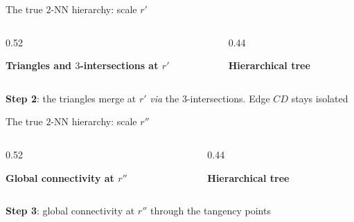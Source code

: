 \documentclass[A4,svgnames,9pt,aspectratio=169]{beamer}
\begin{document}
\begin{frame}{The true $2$-NN hierarchy: scale $r'$}
    \begin{columns}[c, onlytextwidth]
        \begin{column}{0.52\textwidth}
            \begin{center}
                \textbf{Triangles and $3$-intersections at $r'$}

                \vspace{0.4cm}
                
            \end{center}
        \end{column}

        \begin{column}{0.44\textwidth}
            \begin{center}
                \textcolor{inria-rouge}{\textbf{Hierarchical tree}}

                \vspace{0.4cm}
                
            \end{center}
        \end{column}
    \end{columns}
    \vspace{0.3cm}
    \begin{center}
        \small \textbf{Step 2}: the triangles merge at $r'$ \emph{via} the $3$-intersections. Edge $CD$ stays isolated
    \end{center}
\end{frame}
\begin{frame}{The true $2$-NN hierarchy: scale $r''$}
    \begin{columns}[c, onlytextwidth]
        \begin{column}{0.52\textwidth}
            \begin{center}
                \textbf{Global connectivity at $r''$}

                \vspace{0.4cm}
                
            \end{center}
        \end{column}

        \begin{column}{0.44\textwidth}
            \begin{center}
                \textcolor{inria-rouge}{\textbf{Hierarchical tree}}

                \vspace{0.4cm}
                
            \end{center}
        \end{column}
    \end{columns}
    \vspace{0.3cm}
    \begin{center}
        \small \textbf{Step 3}: global connectivity at $r''$ through the tangency points
    \end{center}
\end{frame}
\end{document}
